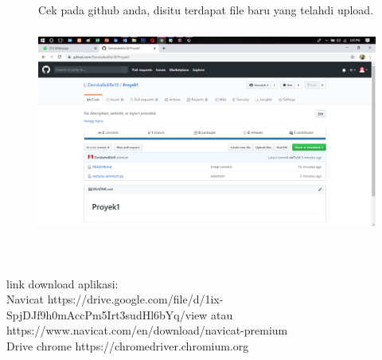 \documentclass{book}
\begin{document}
\begin{enumerate}
\begin{figure}
    \item Cek pada github anda, disitu terdapat file baru yang telahdi upload.\\
    \centerline{\includegraphics [width=12.13cm, height=6.82cm]{figures/5.8.png}}\\
\end{figure}
\end{enumerate}



link download aplikasi:\\
Navicat https://drive.google.com/file/d/1ix-SpjDJf9h0mAccPm5Irt3sudHl6bYq/view atau\\ https://www.navicat.com/en/download/navicat-premium\\
Drive chrome https://chromedriver.chromium.org\\
\end{document}
